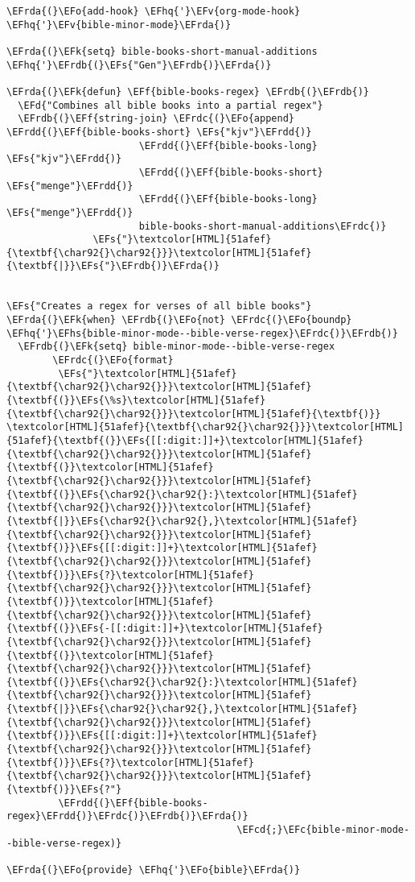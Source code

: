 \documentclass[a4wide,10pt]{article}
\newcommand{\EFc}[1]{\textcolor{EFc}{#1}} %
\newcommand{\EFcd}[1]{\textcolor{EFcd}{#1}} %
\newcommand{\EFs}[1]{\textcolor{EFs}{#1}} %
\newcommand{\EFd}[1]{\textcolor{EFd}{#1}} %
\newcommand{\EFk}[1]{\textcolor{EFk}{#1}} %
\newcommand{\EFf}[1]{\textcolor{EFf}{#1}} %
\newcommand{\EFv}[1]{\textcolor{EFv}{#1}} %
\newcommand{\EFo}[1]{\textcolor{EFo}{#1}} %
\newcommand{\EFhq}[1]{\textcolor{EFhq}{#1}} %
\newcommand{\EFhs}[1]{\textcolor{EFhs}{#1}} %
\newcommand{\EFrda}[1]{\textcolor{EFrda}{#1}} %
\newcommand{\EFrdb}[1]{\textcolor{EFrdb}{#1}} %
\newcommand{\EFrdc}[1]{\textcolor{EFrdc}{#1}} %
\newcommand{\EFrdd}[1]{\textcolor{EFrdd}{#1}} %
\begin{document}
\begin{Code}
\begin{Verbatim}
\EFrda{(}\EFo{add-hook} \EFhq{'}\EFv{org-mode-hook} \EFhq{'}\EFv{bible-minor-mode}\EFrda{)}

\EFrda{(}\EFk{setq} bible-books-short-manual-additions \EFhq{'}\EFrdb{(}\EFs{"Gen"}\EFrdb{)}\EFrda{)}

\EFrda{(}\EFk{defun} \EFf{bible-books-regex} \EFrdb{(}\EFrdb{)}
  \EFd{"Combines all bible books into a partial regex"}
  \EFrdb{(}\EFf{string-join} \EFrdc{(}\EFo{append} \EFrdd{(}\EFf{bible-books-short} \EFs{"kjv"}\EFrdd{)}
                       \EFrdd{(}\EFf{bible-books-long} \EFs{"kjv"}\EFrdd{)}
                       \EFrdd{(}\EFf{bible-books-short} \EFs{"menge"}\EFrdd{)}
                       \EFrdd{(}\EFf{bible-books-long} \EFs{"menge"}\EFrdd{)}
                       bible-books-short-manual-additions\EFrdc{)}
               \EFs{"}\textcolor[HTML]{51afef}{\textbf{\char92{}\char92{}}}\textcolor[HTML]{51afef}{\textbf{|}}\EFs{"}\EFrdb{)}\EFrda{)}


\EFs{"Creates a regex for verses of all bible books"}
\EFrda{(}\EFk{when} \EFrdb{(}\EFo{not} \EFrdc{(}\EFo{boundp} \EFhq{'}\EFhs{bible-minor-mode--bible-verse-regex}\EFrdc{)}\EFrdb{)}
  \EFrdb{(}\EFk{setq} bible-minor-mode--bible-verse-regex
        \EFrdc{(}\EFo{format}
         \EFs{"}\textcolor[HTML]{51afef}{\textbf{\char92{}\char92{}}}\textcolor[HTML]{51afef}{\textbf{(}}\EFs{\%s}\textcolor[HTML]{51afef}{\textbf{\char92{}\char92{}}}\textcolor[HTML]{51afef}{\textbf{)}} \textcolor[HTML]{51afef}{\textbf{\char92{}\char92{}}}\textcolor[HTML]{51afef}{\textbf{(}}\EFs{[[:digit:]]+}\textcolor[HTML]{51afef}{\textbf{\char92{}\char92{}}}\textcolor[HTML]{51afef}{\textbf{(}}\textcolor[HTML]{51afef}{\textbf{\char92{}\char92{}}}\textcolor[HTML]{51afef}{\textbf{(}}\EFs{\char92{}\char92{}:}\textcolor[HTML]{51afef}{\textbf{\char92{}\char92{}}}\textcolor[HTML]{51afef}{\textbf{|}}\EFs{\char92{}\char92{},}\textcolor[HTML]{51afef}{\textbf{\char92{}\char92{}}}\textcolor[HTML]{51afef}{\textbf{)}}\EFs{[[:digit:]]+}\textcolor[HTML]{51afef}{\textbf{\char92{}\char92{}}}\textcolor[HTML]{51afef}{\textbf{)}}\EFs{?}\textcolor[HTML]{51afef}{\textbf{\char92{}\char92{}}}\textcolor[HTML]{51afef}{\textbf{)}}\textcolor[HTML]{51afef}{\textbf{\char92{}\char92{}}}\textcolor[HTML]{51afef}{\textbf{(}}\EFs{-[[:digit:]]+}\textcolor[HTML]{51afef}{\textbf{\char92{}\char92{}}}\textcolor[HTML]{51afef}{\textbf{(}}\textcolor[HTML]{51afef}{\textbf{\char92{}\char92{}}}\textcolor[HTML]{51afef}{\textbf{(}}\EFs{\char92{}\char92{}:}\textcolor[HTML]{51afef}{\textbf{\char92{}\char92{}}}\textcolor[HTML]{51afef}{\textbf{|}}\EFs{\char92{}\char92{},}\textcolor[HTML]{51afef}{\textbf{\char92{}\char92{}}}\textcolor[HTML]{51afef}{\textbf{)}}\EFs{[[:digit:]]+}\textcolor[HTML]{51afef}{\textbf{\char92{}\char92{}}}\textcolor[HTML]{51afef}{\textbf{)}}\EFs{?}\textcolor[HTML]{51afef}{\textbf{\char92{}\char92{}}}\textcolor[HTML]{51afef}{\textbf{)}}\EFs{?"}
         \EFrdd{(}\EFf{bible-books-regex}\EFrdd{)}\EFrdc{)}\EFrdb{)}\EFrda{)}
                                        \EFcd{;}\EFc{bible-minor-mode--bible-verse-regex)}

\EFrda{(}\EFo{provide} \EFhq{'}\EFo{bible}\EFrda{)}
\end{Verbatim}
\end{Code}
\end{document}
